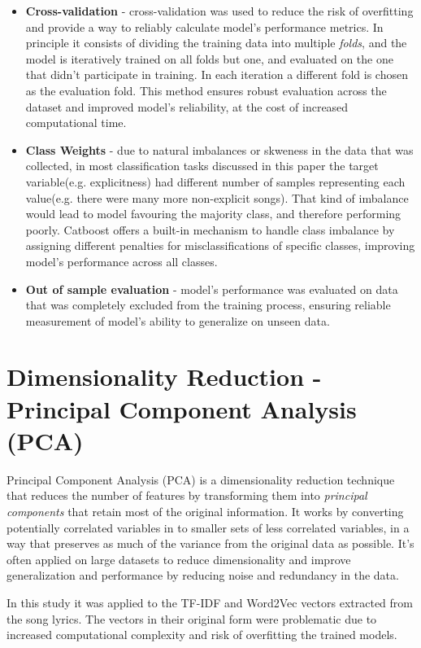 \begin{itemize}
  \item \textbf{Cross-validation} - cross-validation was used to reduce the
    risk of overfitting and provide a way to reliably calculate model's
    performance metrics. In principle it consists of dividing the training
    data into multiple \textit{folds}, and the model is iteratively trained
    on all folds but one, and evaluated on the one that didn't participate in
    training. In each iteration a different fold is chosen as the evaluation
    fold. This method ensures robust evaluation across the dataset and improved
    model's reliability, at the cost of increased computational time.
  \item \textbf{Class Weights} - due to natural imbalances or skweness in the
    data that was collected, in most classification tasks discussed in this
    paper the target variable(e.g. explicitness) had different number of samples
    representing each value(e.g. there were many more non-explicit songs). That
    kind of imbalance would lead to model favouring the majority class, and
    therefore performing poorly. Catboost offers a built-in mechanism to handle
    class imbalance by assigning different penalties for misclassifications
    of specific classes, improving model's performance across all classes.
  \item \textbf{Out of sample evaluation} - model's performance was evaluated
    on data that was completely excluded from the training process, ensuring
    reliable measurement of model's ability to generalize on unseen data.
\end{itemize}

\section{Dimensionality Reduction - Principal Component Analysis (PCA)}
\label{sec:dimensionalityreduction}
Principal Component Analysis (PCA) is a dimensionality reduction technique
that reduces the number of features by transforming them into \textit{principal
components} that retain most of the original information. It works by
converting potentially correlated variables in to smaller sets of less correlated
variables, in a way that preserves as much of the variance from the original
data as possible. It's often applied on large datasets to reduce dimensionality
and improve generalization and performance by reducing noise and redundancy
in the data.\cite{pca}

In this study it was applied to the TF-IDF and Word2Vec vectors extracted from
the song lyrics. The vectors in their original form were problematic due  to
increased computational complexity and risk of overfitting the trained models.


